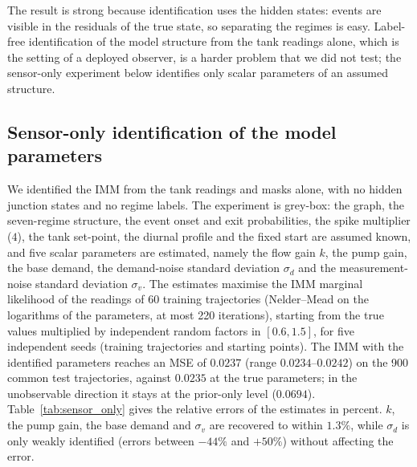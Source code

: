 \documentclass[conference]{IEEEtran}
\begin{document}
The result is strong because identification uses the hidden states: events are visible in the residuals of the true state, so separating the regimes is easy. Label-free identification of the model structure from the tank readings alone, which is the setting of a deployed observer, is a harder problem that we did not test; the sensor-only experiment below identifies only scalar parameters of an assumed structure.

\subsection*{Sensor-only identification of the model parameters}
We identified the IMM from the tank readings and masks alone, with no hidden junction states and no regime labels. The experiment is grey-box: the graph, the seven-regime structure, the event onset and exit probabilities, the spike multiplier ($4$), the tank set-point, the diurnal profile and the fixed start are assumed known, and five scalar parameters are estimated, namely the flow gain $k$, the pump gain, the base demand, the demand-noise standard deviation $\sigma_d$ and the measurement-noise standard deviation $\sigma_v$. The estimates maximise the IMM marginal likelihood of the readings of 60 training trajectories (Nelder--Mead on the logarithms of the parameters, at most 220 iterations), starting from the true values multiplied by independent random factors in $[0.6,1.5]$, for five independent seeds (training trajectories and starting points). The IMM with the identified parameters reaches an MSE of $0.0237$ (range $0.0234$--$0.0242$) on the 900 common test trajectories, against $0.0235$ at the true parameters; in the unobservable direction it stays at the prior-only level ($0.0694$). Table~\ref{tab:sensor_only} gives the relative errors of the estimates in percent. $k$, the pump gain, the base demand and $\sigma_v$ are recovered to within $1.3\%$, while $\sigma_d$ is only weakly identified (errors between $-44\%$ and $+50\%$) without affecting the error. 
\end{document}
